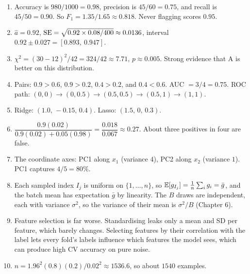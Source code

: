 \begin{enumerate}
  \item Accuracy is $980/1000=0.98$, precision is $45/60=0.75$, and recall is
  $45/50=0.90$. So $F_1=1.35/1.65\approx0.818$. Never flagging scores $0.95$.
  \item $\hat a=0.92$, $\operatorname{SE}=\sqrt{0.92\times0.08/400}\approx0.0136$,
  interval $0.92\pm0.027=[0.893,\ 0.947]$.
  \item $\chi^2=(30-12)^2/42=324/42\approx7.71$, $p\approx0.005$. Strong evidence that A is
  better on this distribution.
  \item Pairs: $0.9>0.6$, $0.9>0.2$, $0.4>0.2$, and $0.4<0.6$. AUC $=3/4=0.75$. ROC path:
  $(0,0)\to(0,0.5)\to(0.5,0.5)\to(0.5,1)\to(1,1)$.
  \item Ridge: $(1.0,\,-0.15,\,0.4)$. Lasso: $(1.5,\,0,\,0.3)$.
  \item $\dfrac{0.9(0.02)}{0.9(0.02)+0.05(0.98)}=\dfrac{0.018}{0.067}\approx0.27$. About
  three positives in four are false.
  \item The coordinate axes: PC1 along $x_1$ (variance $4$), PC2 along $x_2$ (variance $1$).
  PC1 captures $4/5=80\%$.
  \item Each sampled index $I_j$ is uniform on $\{1,\dots,n\}$, so
  $\operatorname{\mathbb{E}}[g_{I_j}]=\frac1n\sum_i g_i=\bar g$, and the batch mean has expectation $\bar g$ by
  linearity. The $B$ draws are independent, each with variance $\sigma^2$, so the variance of
  their mean is $\sigma^2/B$ (Chapter 6).
  \item Feature selection is far worse. Standardising leaks only a mean and SD per feature,
  which barely changes. Selecting features by their correlation with the label lets every fold's
  labels influence which features the model sees, which can produce high CV accuracy on pure
  noise.
  \item $n=1.96^2(0.8)(0.2)/0.02^2\approx1536.6$, so about $1540$ examples.
\end{enumerate}
